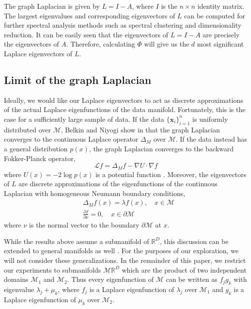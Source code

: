 \documentclass{article}
\numberwithin{equation}{section}
\theoremstyle{definition}
\begin{document}
The graph Laplacian is given by $L = I - A$, where $I$ is the $n \times n$ identity matrix. The largest eigenvalues and corresponding eigenvectors of $L$ can be computed for further spectral analysis methods such as spectral clustering and dimensionality reduction. It can be easily seen that the eigenvectors of $L = I-A$ are precisely the eigenvectors of $A$. Therefore, calculating $\Phi$ will give us the $d$ most significant Laplace eigenvectors of $L$.

\subsection{Limit of the graph Laplacian}
Ideally, we would like our Laplace eigenvectors to act as discrete approximations of the actual Laplace eigenfunctions of the data manifold. Fortunately, this is the case for a sufficiently large sample of data. If the data $\{\mathbf{x}_i\}_{i=1}^n$ is uniformly distributed over $\mathcal{M}$, Belkin and Niyogi show in \cite{Belkin_2008} that the graph Laplacian converges to the continuous Laplace operator $\Delta_M$ over $\mathcal{M}$. If the data instead has a general distribution $p(x)$, the graph Laplacian converges to the backward Fokker-Planck operator, 
\begin{equation}\label{fokker-placnk}
    \mathcal{L}f = \Delta_M f - \nabla U \cdot \nabla f
\end{equation}
where $U(x) = -2\log p(x)$ is a potential function \cite{Nadler_2006}. Moreover, the eigenvectors of $L$ are discrete approximations of the eigenfunctions of the continuous Laplacian with homogeneous Neumann boundary conditions,
\begin{align}
    &\Delta_M f(x) = \lambda f(x), \quad x \in \mathcal{M} \\
    &\frac{\partial f}{\partial \nu} = 0, \quad x \in \partial \mathcal{M}
\end{align}
where $\nu$ is the normal vector to the boundary $\partial\mathcal{M}$ at $x$.

While the results above assume a submanifold of $\mathbb{R}^D$, this discussion can be extended to general manifolds as well \cite{Belkin_2008}. For the purposes of our exploration, we will not consider these generalizations. In the remainder of this paper, we restrict our experiments to submanifolds $\mathcal{M} \mathbb{R}^D$ which are the product of two independent domains $\mathcal{M}_1$ and $\mathcal{M}_2$. Thus every eigenfunction of $\mathcal{M}$ can be written as $f_j g_k$ with eigenvalue $\lambda_j + \mu_k$, where $f_j$ is a Laplace eigenfunction of $\lambda_j$ over $\mathcal{M}_1$ and $g_k$ is a Laplace eigenfunction of $\mu_k$ over  $\mathcal{M}_2$.
\end{document}

